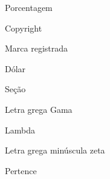 %
\clearpage
\begin{simbolos}
  \item [\% ] Porcentagem
  \item [ © ] Copyright
  \item [ ® ] Marca registrada
  \item [ \$ ] Dólar
  \item [ § ] Seção
  \item[$ \Gamma $] Letra grega Gama
  \item[$ \Lambda $] Lambda
  \item[$ \zeta $] Letra grega minúscula zeta
  \item[$ \in $] Pertence
\end{simbolos}
